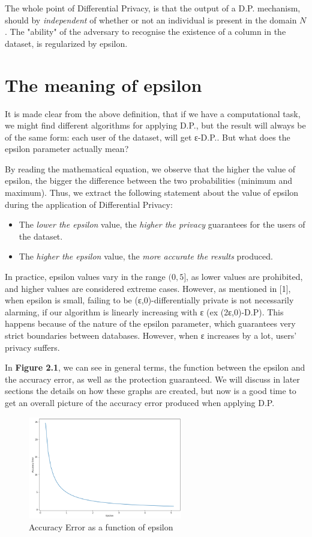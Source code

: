 The whole point of Differential Privacy, is that the output of a D.P. mechanism, should by \emph{independent} of whether or not an individual is present in the domain $N$. The "ability" of the adversary to recognise the existence of a column in the dataset, is regularized by epsilon.

\section{The meaning of epsilon}
It is made clear from the above definition, that if we have a computational task, we might find different algorithms for applying D.P., but the result will always be of the same form: each user of the dataset, will get ε-D.P.. But what does the epsilon parameter actually mean?

By reading the mathematical equation, we observe that the higher the value of epsilon, the bigger the difference between the two probabilities (minimum and maximum). Thus, we extract the following statement about the value of epsilon during the application of Differential Privacy:

\begin{itemize}
    \item The \emph{lower the epsilon} value, the \emph{higher the privacy} guarantees for the users of the dataset.
    \item The \emph{higher the epsilon} value, the \emph{more accurate the results} produced.
\end{itemize}

In practice, epsilon values vary in the range $(0,5]$, as lower values are prohibited, and higher values are considered extreme cases. However, as mentioned in [1],  when epsilon is small, failing to be (ε,0)-differentially private is not necessarily alarming, if our algorithm is linearly increasing with ε (ex (2ε,0)-D.P). This happens because of the nature of the epsilon parameter, which guarantees very strict boundaries between databases. However, when ε increases by a lot, users' privacy suffers. 

In \textbf{Figure 2.1}, we can see in general terms, the function between the epsilon and the accuracy error, as well as the protection guaranteed. We will discuss in later sections the details on how these graphs are created, but now is a good time to get an overall picture of the accuracy error produced when applying D.P.
\bigskip
\bigskip\bigskip

\begin{figure}[!htb]\centering
      \includegraphics[width=0.6\textwidth]{images/epsilon_intro_graph.png}
  \caption{Accuracy Error as a function of epsilon}
\end{figure}

